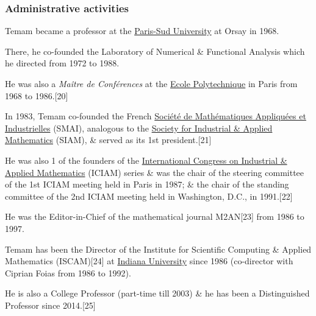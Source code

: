 \documentclass{article}
\begin{document}
\subsubsection{Administrative activities}
Temam became a professor at the \href{https://en.wikipedia.org/wiki/Paris-Sud_University}{Paris-Sud University} at Orsay in 1968.

There, he co-founded the Laboratory of Numerical \& Functional Analysis which he directed from 1972 to 1988.

He was also a \textit{Maître de Conférences} at the \href{https://en.wikipedia.org/wiki/Ecole_Polytechnique}{Ecole Polytechnique} in Paris from 1968 to 1986.[20]

%
In 1983, Temam co-founded the French \href{https://en.wikipedia.org/wiki/Soci%C3%A9t%C3%A9_de_Math%C3%A9matiques_Appliqu%C3%A9es_et_Industrielles}{Société de Mathématiques Appliquées et Industrielles} (SMAI), analogous to the \href{https://en.wikipedia.org/wiki/Society_for_Industrial_and_Applied_Mathematics}{Society for Industrial \& Applied Mathematics} (SIAM), \& served as its 1st president.[21]

He was also 1 of the founders of the \href{https://en.wikipedia.org/wiki/International_Congress_on_Industrial_and_Applied_Mathematics}{International Congress on Industrial \& Applied Mathematics} (ICIAM) series \& was the chair of the steering committee of the 1st ICIAM meeting held in Paris in 1987; \& the chair of the standing committee of the 2nd ICIAM meeting held in Washington, D.C., in 1991.[22]

He was the Editor-in-Chief of the mathematical journal M2AN[23] from 1986 to 1997.

%
Temam has been the Director of the Institute for Scientific Computing \& Applied Mathematics (ISCAM)[24] at \href{https://en.wikipedia.org/wiki/Indiana_University_Bloomington}{Indiana University} since 1986 (co-director with Ciprian Foias from 1986 to 1992).

He is also a College Professor (part-time till 2003) \& he has been a Distinguished Professor since 2014.[25]
\end{document}
